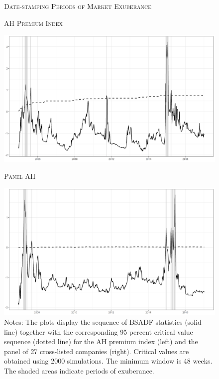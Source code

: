 \documentclass[11pt]{article}
\begin{document}
\begin{figure}[!htbp]
    \centering  
    
     \caption{\textsc{Date-stamping Periods of Market Exuberance}}
    
    \begin{minipage}{0.48\textwidth}
        \centering
        \caption*{\textsc{AH Premium Index}}
        \includegraphics[width=\textwidth]{autoplot-p1.png}
    \end{minipage}\hfill
    \begin{minipage}{0.48\textwidth}
        \centering
        \caption*{\textsc{Panel AH}}
        \includegraphics[width=\textwidth]{autoplot-p2.png}
    \end{minipage}\hfill

    
    \caption*{\scriptsize Notes:  The plots display the sequence of BSADF statistics (solid line) together with the corresponding 95 percent critical value sequence (dotted line) for the AH premium index (left) and the panel of 27 cross-listed companies (right). Critical values are obtained using 2000 simulations. The minimum window is 48 weeks. The shaded areas indicate periods of exuberance.}
     
    \label{fig:autoplot}
    
\end{figure}
\end{document}
